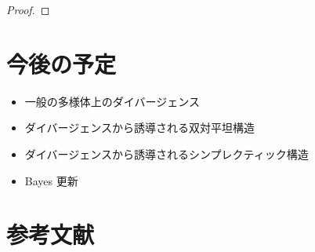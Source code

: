 \documentclass[report]{jlreq}
\begin{document}
\begin{proof}
    \TODO{}
\end{proof}


%
\section*{今後の予定}

\begin{itemize}
    \item 一般の多様体上のダイバージェンス
    \item ダイバージェンスから誘導される双対平坦構造
    \item ダイバージェンスから誘導されるシンプレクティック構造
    \item Bayes 更新
\end{itemize}

%
\section*{参考文献}


\nocite{amari_information_2016}
\nocite{amari_methods_2007}
\nocite{ay_information_2017}

{
    \renewcommand{\bibsection}{}
    
    
}

%
\end{document}
